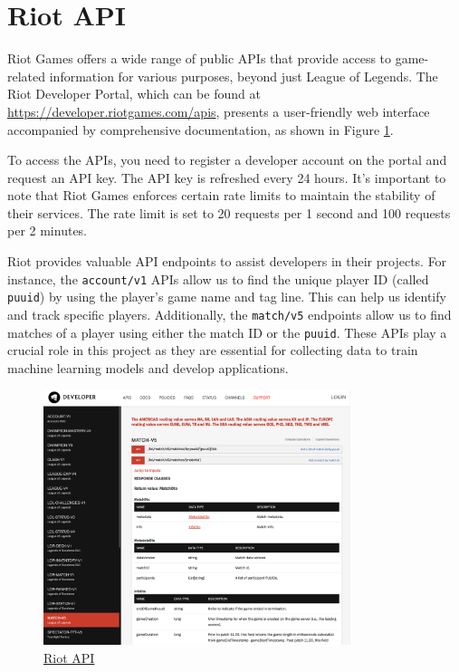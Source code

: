 \documentclass[11pt,a4paper,oneside]{report}
\begin{document}
\section{Riot API}
\label{sec:riot_api}

Riot Games offers a wide range of public APIs that provide access to game-related information for various purposes, beyond just League of Legends. The Riot Developer Portal, which can be found at \href{https://developer.riotgames.com/apis}{https://developer.riotgames.com/apis}, presents a user-friendly web interface accompanied by comprehensive documentation, as shown in Figure \ref{fig:riot_api}.

To access the APIs, you need to register a developer account on the portal and request an API key. The API key is refreshed every 24 hours. It's important to note that Riot Games enforces certain rate limits to maintain the stability of their services. The rate limit is set to 20 requests per 1 second and 100 requests per 2 minutes.

Riot provides valuable API endpoints to assist developers in their projects. For instance, the \texttt{account/v1} APIs allow us to find the unique player ID (called \texttt{puuid}) by using the player's game name and tag line. This can help us identify and track specific players. Additionally, the \texttt{match/v5} endpoints allow us to find matches of a player using either the match ID or the \texttt{puuid}. These APIs play a crucial role in this project as they are essential for collecting data to train machine learning models and develop applications.

\begin{figure}[H]
  \centering
  \includegraphics[width=0.8\textwidth]{assets/riot_api.png}
  \caption{\href{https://developer.riotgames.com/apis}{Riot API}}
  \label{fig:riot_api}
\end{figure}
\end{document}
